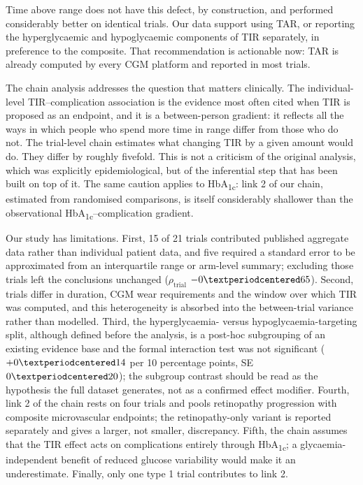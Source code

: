 \documentclass[11pt,a4paper]{article}
\newcommand{\pp}{percentage points}
\begin{document}
Time above range does not have this defect, by construction, and performed considerably better on identical
trials. Our data support using TAR, or reporting the hyperglycaemic and hypoglycaemic components of TIR
separately, in preference to the composite. That recommendation is actionable now: TAR is already computed by
every CGM platform and reported in most trials.

The chain analysis addresses the question that matters clinically. The individual-level TIR--complication
association is the evidence most often cited when TIR is proposed as an endpoint, and it is a between-person
gradient: it reflects all the ways in which people who spend more time in range differ from those who do not.
The trial-level chain estimates what changing TIR by a given amount would do. They differ by roughly
fivefold. This is not a criticism of the original analysis, which was explicitly epidemiological, but of the
inferential step that has been built on top of it. The same caution applies to HbA\textsubscript{1c}: link 2
of our chain, estimated from randomised comparisons, is itself considerably shallower than the observational
HbA\textsubscript{1c}--complication gradient.

Our study has limitations. First, 15 of 21 trials contributed published aggregate data rather than individual
patient data, and five required a standard error to be approximated from an interquartile range or arm-level
summary; excluding those trials left the conclusions unchanged ($\rho_{\mathrm{trial}}$
$-0\textperiodcentered65$). Second, trials differ in duration, CGM wear requirements and the window over
which TIR was computed, and this heterogeneity is absorbed into the between-trial variance rather than
modelled. Third, the hyperglycaemia- versus hypoglycaemia-targeting split, although defined before the
analysis, is a post-hoc subgrouping of an existing evidence base and the formal interaction test was not
significant ($+0\textperiodcentered14$ per 10 \pp, SE $0\textperiodcentered20$); the subgroup contrast should
be read as the hypothesis the full dataset generates, not as a confirmed effect modifier. Fourth, link 2 of
the chain rests on four trials and pools retinopathy progression with composite microvascular endpoints; the
retinopathy-only variant is reported separately and gives a larger, not smaller, discrepancy. Fifth, the
chain assumes that the TIR effect acts on complications entirely through HbA\textsubscript{1c}; a
glycaemia-independent benefit of reduced glucose variability would make it an underestimate. Finally, only
one type 1 trial contributes to link 2.
\end{document}
